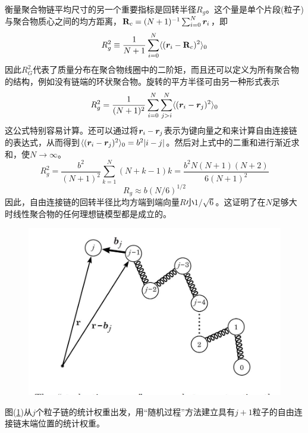 衡量聚合物链平均尺寸的另一个重要指标是回转半径$R_{g}$。这个量是单个片段(粒子)与聚合物质心之间的均方距离，$\mathbf{R}_{c}=(N+1)^{-1} \sum _{i=0}^{N} \bm{r}_{i}$，即\\
\begin{equation}
R_{g}^2 \equiv \frac{1}{N+1} \sum _{i=0}^{N} \langle (\bm{r}_{i}- \mathbf{R}_{c})^2 \rangle_{0} 
\label{2.14}
\end{equation}
因此$R_{G}^2$代表了质量分布在聚合物线圈中的二阶矩，而且还可以定义为所有聚合物的结构，例如没有链端的环状聚合物。旋转的平方半径可由另一种形式表示\\
\begin{equation}
R_{g}^2=\frac{1}{(N+1)^2} \sum _{i=0}^{N} \sum _{j>i}^{N} \langle (\bm{r}_{i}- \bm{r}_{j})^2 \rangle_{0} 
\label{2.15}
\end{equation}
这公式特别容易计算。还可以通过将$\bm{r}_{i}-\bm{r}_{j}$表示为键向量之和来计算自由连接链的表达式，从而得到$\langle (\bm{r}_{i}- \bm{r}_{j})^2 \rangle_{0}=b^2 |i-j|$。然后对上式中的二重和进行渐近求和，使$N \rightarrow \infty $。\\
\begin{equation}
R_{g}^{2} = \frac{b^2}{(N+1)^2} \sum _{k=1} ^{N} (N+k-1)k=\frac{b^2 N(N+1)(N+2)}{6(N+1)^2}
\end{equation}
\begin{equation}
R_{g}\approx b(N/6)^{1/2}
\label{2.16}
\end{equation}
因此，自由连接链的回转半径比均方端到端向量$R$小$1/\sqrt{6}$。这证明了在$N$足够大时线性聚合物的任何理想链模型都是成立的。\\
\begin{figure}[H]
	\centering   
	\includegraphics[width=12cm]{./figures/3.png}
	\caption{ }
	\label{2.2}
\end{figure}
图(\ref{2.2})从$j$个粒子链的统计权重出发，用“随机过程”方法建立具有$j+1$粒子的自由连接链末端位置的统计权重。\\

